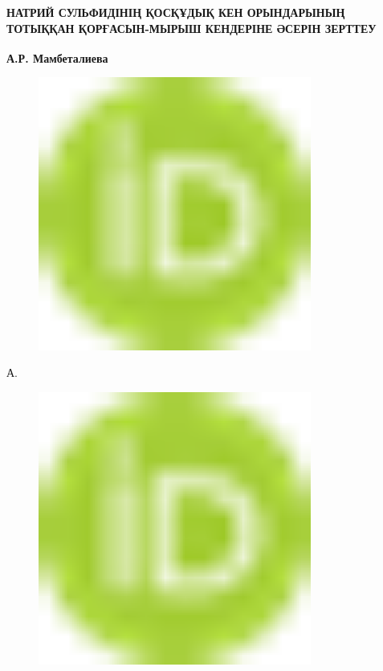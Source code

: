 
{\bfseries НАТРИЙ СУЛЬФИДІНІҢ ҚОСҚҰДЫҚ КЕН ОРЫНДАРЫНЫҢ ТОТЫҚҚАН
ҚОРҒАСЫН-МЫРЫШ КЕНДЕРІНЕ ӘСЕРІН ЗЕРТТЕУ}

{\bfseries А.Р. Мамбеталиева\textsuperscript{\envelope }}
\begin{figure}[H]
	\centering
	\includegraphics[width=0.8\textwidth]{media/gorn/image1}
	\caption*{}
\end{figure}

А.
\begin{figure}[H]
	\centering
	\includegraphics[width=0.8\textwidth]{media/gorn/image1}
	\caption*{}
\end{figure}

